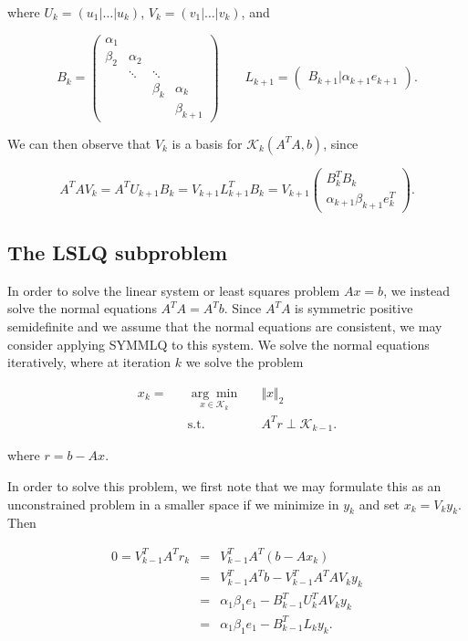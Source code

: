 \documentclass[11pt]{article}
\newcommand{\KK}{\mathcal{K}_k}
\begin{document}
where $U_k = \left( u_1  | \dots | u_k \right)$, $V_k = \left( v_1 | \dots | v_k \right)$, and

\begin{equation*}
B_k = \begin{pmatrix}
\alpha_1 & & & \\
\beta_2 & \alpha_2 & & \\
 & \ddots & \ddots & \\
 & & \beta_k & \alpha_k \\
 & & & \beta_{k+1} 
\end{pmatrix} \qquad L_{k+1} = \begin{pmatrix}
B_{k+1} | \alpha_{k+1} e_{k+1}
\end{pmatrix}.
\end{equation*}

We can then observe that $V_k$ is a basis for $\KK (A^T A, b)$, since

$$ A^T A V_k = A^T U_{k+1} B_k = V_{k+1} L^T_{k+1} B_k = V_{k+1} \begin{pmatrix}
B^T_k B_k \\
\alpha_{k+1} \beta_{k+1} e^T_k
\end{pmatrix}.
$$

\subsection{The LSLQ subproblem}
In order to solve the linear system or least squares problem $Ax = b$, we instead solve the normal equations $A^T A = A^T b$. Since $A^T A$ is symmetric positive semidefinite and we assume that the normal equations are consistent, we may consider applying SYMMLQ to this system.
We solve the normal equations iteratively, where at iteration $k$ we solve the problem

\begin{equation}
\label{lslqsubproblem}
\begin{aligned}
x_k =&& \underset{x \in \KK}{\arg\min} && \Vert x \Vert_2 \\
&& \text{s.t.} && A^T r \perp \mathcal{K}_{k-1}.
\end{aligned}
\end{equation}

where $r = b - Ax$.

In order to solve this problem, we first note that we may formulate this as an unconstrained problem in a smaller space if we minimize in $y_k$ and set $x_k = V_k y_k$. Then

\begin{eqnarray*}
0 = V_{k-1}^T A^T r_k &=& V_{k-1}^T A^T (b - Ax_k) \\
&=& V_{k-1}^T A^T b - V_{k-1}^T A^T A V_k y_k \\
&=& \alpha_1 \beta_1 e_1 - B_{k-1}^T U_k^T A V_k y_k \\
&=& \alpha_1 \beta_1 e_1 - B_{k-1}^T L_k y_k.
\end{eqnarray*}
\end{document}
